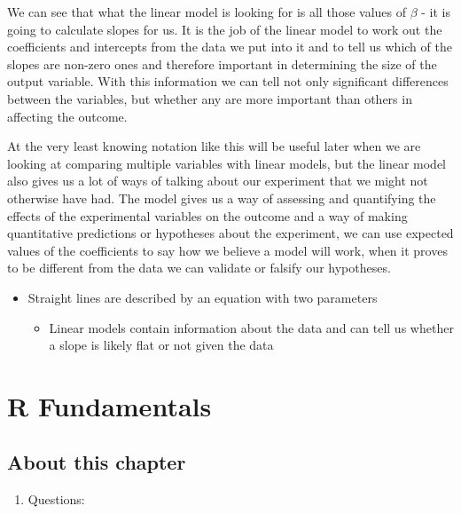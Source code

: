 \documentclass[
]{book}
\providecommand{\tightlist}{%
  \setlength{\itemsep}{0pt}\setlength{\parskip}{0pt}}
\newenvironment{roundup}
{ \begin{tcolorbox}[colbacktitle=yellow!50!white,
title=Round Up,coltitle=black,
fonttitle=\bfseries] }
{  \end{tcolorbox} }
\begin{document}
We can see that what the linear model is looking for is all those values of \(\beta\) - it is going to calculate slopes for us. It is the job of the linear model to work out the coefficients and intercepts from the data we put into it and to tell us which of the slopes are non-zero ones and therefore important in determining the size of the output variable. With this information we can tell not only significant differences between the variables, but whether any are more important than others in affecting the outcome.

At the very least knowing notation like this will be useful later when we are looking at comparing multiple variables with linear models, but the linear model also gives us a lot of ways of talking about our experiment that we might not otherwise have had. The model gives us a way of assessing and quantifying the effects of the experimental variables on the outcome and a way of making quantitative predictions or hypotheses about the experiment, we can use expected values of the coefficients to say how we believe a model will work, when it proves to be different from the data we can validate or falsify our hypotheses.

\begin{roundup}
\begin{itemize}
\tightlist
\item
  Straight lines are described by an equation with two parameters

  \begin{itemize}
  \tightlist
  \item
    Linear models contain information about the data and can tell us whether a slope is likely flat or not given the data
  \end{itemize}
\end{itemize}
\end{roundup}

\hypertarget{r-fundamentals}{%
\chapter{R Fundamentals}\label{r-fundamentals}}

\hypertarget{about-this-chapter}{%
\section{About this chapter}\label{about-this-chapter}}

\begin{enumerate}
\def\labelenumi{\arabic{enumi}.}
\tightlist
\item
  Questions:
\end{enumerate}
\end{document}
